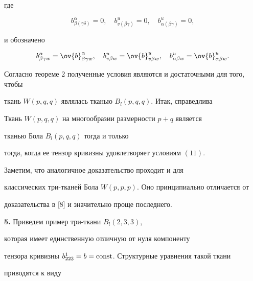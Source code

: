 где


$$


b^{\alpha}_{\beta (\gamma \delta)}=0, \quad b^{u}_{v (\beta \gamma)}=0,


\quad b^{u}_{\alpha (\beta \gamma)}=0,


$$


и обозначено


$$


b^{\alpha}_{\beta \gamma w}=\ov{b}^{\alpha}_{\beta \gamma w},


\quad


b^{u}_{v \beta w}=\ov{b}^{u}_{v \beta w},


\quad


b^{u}_{\alpha \beta w}=\ov{b}^{u}_{\alpha \beta w}.


$$


Согласно теореме 2 полученные условия являются и достаточными для того, чтобы


ткань $W(p,q,q)$ являлась тканью $B_{l}(p,q,q)$. Итак, справедлива





\begin{thm}


Ткань $W(p,q,q)$ на многообразии размерности $p+q$ является


тканью Бола $B_{l}(p,q,q)$ тогда и только 


тогда, когда ее тензор кривизны удовлетворяет условиям $(11)$.


\end{thm}





Заметим, что аналогичное доказательство проходит и для


классических три-тканей Бола $W(p,p,p)$. Оно принципиально отличается от


доказательства в [8] и значительно проще последнего.


\medskip





{\bf 5.} Приведем пример три-ткани $B_{l}(2,3,3)$,


которая имеет единственную отличную от нуля компоненту


тензора кривизны $b^{1}_{223}=b=\operatorname{const}$. Структурные уравнения такой ткани


приводятся к виду


